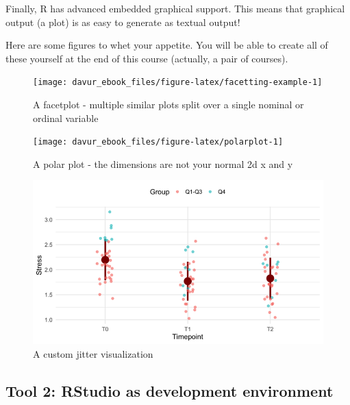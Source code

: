 \documentclass[]{book}
\begin{document}
Finally, R has advanced embedded graphical support. This means that graphical output (a plot) is as easy to generate as textual output!

Here are some figures to whet your appetite. You will be able to create all of these yourself at the end of this course (actually, a pair of courses).

\begin{figure}

{\centering \texttt{[image: davur\_ebook\_files/figure-latex/facetting-example-1]} 

}

\caption{A facetplot - multiple similar plots split over a single nominal or ordinal variable}\label{fig:facetting-example}
\end{figure}

\begin{figure}

{\centering \texttt{[image: davur\_ebook\_files/figure-latex/polarplot-1]} 

}

\caption{A polar plot - the dimensions are not your normal 2d x and y}\label{fig:polarplot}
\end{figure}

\begin{figure}
\centering
\includegraphics{figures/ptsd-jitter-5-1s.png}
\caption{A custom jitter visualization}
\end{figure}

\hypertarget{tool-2-rstudio-as-development-environment}{%
\subsection{Tool 2: RStudio as development environment}\label{tool-2-rstudio-as-development-environment}}
\end{document}
